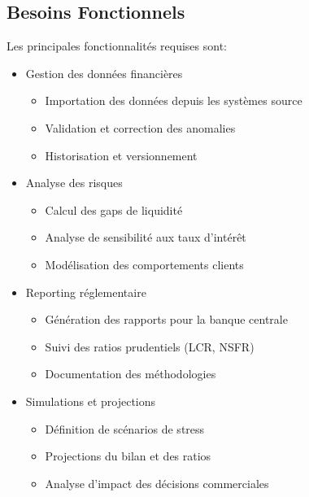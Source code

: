 \documentclass[12pt,a4paper]{report}
\begin{document}
\subsection{Besoins Fonctionnels}
Les principales fonctionnalités requises sont:
\begin{itemize}
    \item Gestion des données financières
        \begin{itemize}
            \item Importation des données depuis les systèmes source
            \item Validation et correction des anomalies
            \item Historisation et versionnement
        \end{itemize}
    \item Analyse des risques
        \begin{itemize}
            \item Calcul des gaps de liquidité
            \item Analyse de sensibilité aux taux d'intérêt
            \item Modélisation des comportements clients
        \end{itemize}
    \item Reporting réglementaire
        \begin{itemize}
            \item Génération des rapports pour la banque centrale
            \item Suivi des ratios prudentiels (LCR, NSFR)
            \item Documentation des méthodologies
        \end{itemize}
    \item Simulations et projections
        \begin{itemize}
            \item Définition de scénarios de stress
            \item Projections du bilan et des ratios
            \item Analyse d'impact des décisions commerciales
        \end{itemize}
\end{itemize}
\end{document}
